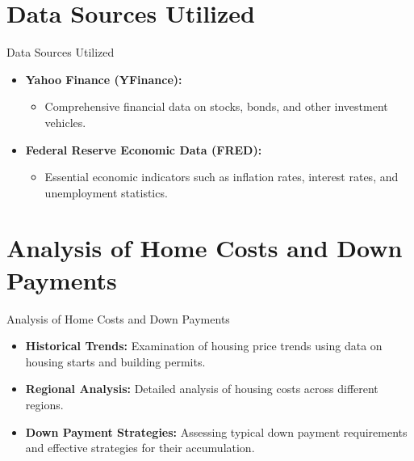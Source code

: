\documentclass{beamer}
\begin{document}
\section{Data Sources Utilized}
\begin{frame}{Data Sources Utilized}
    \begin{multicols}{2}
        \begin{itemize}
            \item \textbf{Yahoo Finance (YFinance):}
            \begin{itemize}
                \item Comprehensive financial data on stocks, bonds, and other investment vehicles.
            \end{itemize}
            \item \textbf{Federal Reserve Economic Data (FRED):}
            \begin{itemize}
                \item Essential economic indicators such as inflation rates, interest rates, and unemployment statistics.
            \end{itemize}
        \end{itemize}
    \end{multicols}
\end{frame}

\section{Analysis of Home Costs and Down Payments}
\begin{frame}{Analysis of Home Costs and Down Payments}
    \begin{itemize}
        \item \textbf{Historical Trends:} Examination of housing price trends using data on housing starts and building permits.
        \item \textbf{Regional Analysis:} Detailed analysis of housing costs across different regions.
        \item \textbf{Down Payment Strategies:} Assessing typical down payment requirements and effective strategies for their accumulation.
    \end{itemize}
\end{frame}
\end{document}
